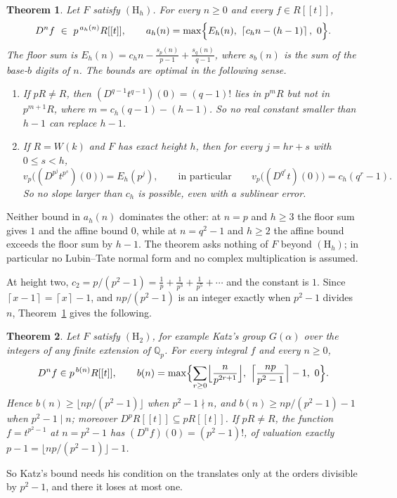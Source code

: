 \documentclass[11pt]{amsart}
\newtheorem{theorem}{Theorem}
\theoremstyle{definition}
\theoremstyle{remark}
\newcommand{\Q}{\mathbb Q}
\newcommand{\vp}{v_p}
\newcommand{\ceil}[1]{\left\lceil #1\right\rceil}
\begin{document}
\begin{theorem}\label{thmA}
Let $F$ satisfy $(\mathrm H_h)$. For every $n\ge0$ and every $f\in R[[t]]$,
\[
 D^nf\ \in\ p^{\,a_h(n)}R[[t]],\qquad
 a_h(n)=\max\Bigl\{E_h(n),\ \ceil{c_hn-(h-1)},\ 0\Bigr\}.
\]
The floor sum is $E_h(n)=c_hn-\frac{s_p(n)}{p-1}+\frac{s_q(n)}{q-1}$, where $s_b(n)$ is the sum of the base-$b$ digits of $n$. The bounds are optimal in the following sense.
\begin{enumerate}
\item If $pR\ne R$, then $(D^{q-1}t^{q-1})(0)=(q-1)!$ lies in $p^{m}R$ but not in $p^{m+1}R$, where $m=c_h(q-1)-(h-1)$. So no real constant smaller than $h-1$ can replace $h-1$.
\item If $R=W(k)$ and $F$ has exact height $h$, then for every $j=hr+s$ with $0\le s<h$,
\[
 \vp\bigl((D^{p^j}t^{p^s})(0)\bigr)=E_h(p^j),\qquad\text{in particular}\qquad \vp\bigl((D^{q^r}t)(0)\bigr)=c_h(q^r-1).
\]
So no slope larger than $c_h$ is possible, even with a sublinear error.
\end{enumerate}
\end{theorem}

Neither bound in $a_h(n)$ dominates the other: at $n=p$ and $h\ge3$ the floor sum gives $1$ and the affine bound $0$, while at $n=q^2-1$ and $h\ge2$ the affine bound exceeds the floor sum by $h-1$. The theorem asks nothing of $F$ beyond $(\mathrm H_h)$; in particular no Lubin--Tate normal form and no complex multiplication is assumed.

At height two, $c_2=p/(p^2-1)=\frac1p+\frac1{p^3}+\frac1{p^5}+\cdots$ and the constant is $1$. Since $\ceil{x-1}=\ceil x-1$, and $np/(p^2-1)$ is an integer exactly when $p^2-1$ divides $n$, Theorem~\ref{thmA} gives the following.

\begin{theorem}\label{thmB}
Let $F$ satisfy $(\mathrm H_2)$, for example Katz's group $G(\alpha)$ over the integers of any finite extension of $\Q_p$. For every integral $f$ and every $n\ge0$,
\[
 D^nf\in p^{\,b(n)}R[[t]],\qquad b(n)=\max\Bigl\{\sum_{r\ge0}\Bigl\lfloor\frac n{p^{2r+1}}\Bigr\rfloor,\ \Bigl\lceil\frac{np}{p^2-1}\Bigr\rceil-1,\ 0\Bigr\}.
\]
Hence $b(n)\ge\lfloor np/(p^2-1)\rfloor$ when $p^2-1\nmid n$, and $b(n)\ge np/(p^2-1)-1$ when $p^2-1\mid n$; moreover $D^p R[[t]]\subseteq pR[[t]]$. If $pR\ne R$, the function $f=t^{p^2-1}$ at $n=p^2-1$ has $(D^nf)(0)=(p^2-1)!$, of valuation exactly $p-1=\lfloor np/(p^2-1)\rfloor-1$.
\end{theorem}

So Katz's bound needs his condition on the translates only at the orders divisible by $p^2-1$, and there it loses at most one.
\end{document}
